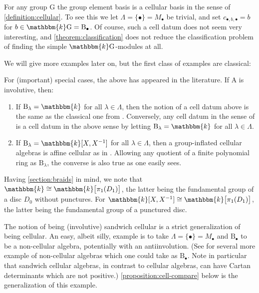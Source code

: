 \documentclass[a4paper,11pt]{amsart}
\newcommand{\setstuff}[1]{\mathrm{#1}}
\newcommand{\KK}{\mathbbm{k}}
\numberwithin{equation}{section}
\let\fullref\autoref
\begin{document}
\begin{example}\label{example:groups}
For any group $\setstuff{G}$ the group element basis 
is a cellular basis in the sense of \fullref{definition:cellular}. 
To see this we let $\Lambda=\{\bullet\}=M_{\bullet}$ be trivial,
and set $c_{\bullet,b,\bullet}=b$ for $b\in\KK\setstuff{G}=\setstuff{B}_{\bullet}$.
Of course, such a cell datum does not seem very interesting, and 
\fullref{theorem:classification} does not reduce the classification 
problem of finding the simple $\KK\setstuff{G}$-modules at all.
\end{example}

We will give more examples later on, but
the first class of examples are classical:

\begin{example}
For (important) special cases, the above has appeared in the literature. 
If $\setstuff{A}$ is involutive, then:
\begin{enumerate}

\item If $\setstuff{B}_{\lambda}=\KK$ for all $\lambda\in\Lambda$, 
then the notion of a cell datum above is the same as 
the classical one from \cite{GrLe-cellular}. Conversely, any cell datum in 
the sense of \cite{GrLe-cellular} is a cell datum in the above sense 
by letting $\setstuff{B}_{\lambda}=\KK$ for all $\lambda\in\Lambda$.

\item If $\setstuff{B}_{\lambda}=\KK[X,X^{-1}]$ 
for all $\lambda\in\Lambda$, 
then a group-inflated cellular algebras is affine cellular 
as in \cite{KoXi-affine-cellular}. Allowing 
any quotient of a finite polynomial ring as $\setstuff{B}_{\lambda}$, 
the converse is also true as one easily sees.

\end{enumerate}
\end{example}

\begin{remark}
Having \fullref{section:braids} in mind,
we note that $\KK\cong\KK\big[\pi_{1}(D_{1})\big]$, the latter being 
the fundamental group of a disc 
$D_{0}$ without punctures.
For $\KK[X,X^{-1}]\cong\KK\big[\pi_{1}(D_{1})\big]$, the latter 
being the fundamental group of a punctured disc.
\end{remark}

\begin{example}
The notion of being (involutive) sandwich cellular 
is a strict generalization of 
being cellular. An easy, albeit silly, example is to take 
$\Lambda=\{\bullet\}=M_{\bullet}$ and $\setstuff{B}_{\bullet}$
to be a non-cellular algebra, potentially with an antiinvolution. 
(See \cite{EhTu-relcell} for several more example of non-cellular algebras
which one could take as $\setstuff{B}_{\bullet}$. 
Note in particular that sandwich cellular 
algebras, in contrast to cellular algebras, 
can have Cartan determinants which 
are not positive.)
\fullref{proposition:cell-compare} 
below is the generalization of this example. 
\end{example}
\end{document}
